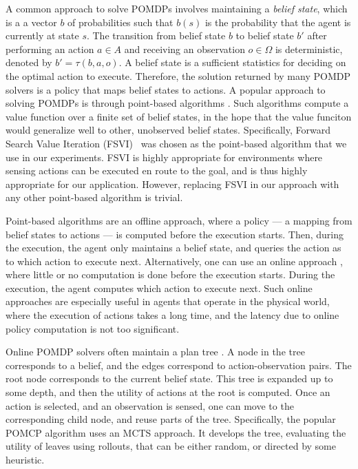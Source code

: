 \documentclass[letterpaper]{article} %
\begin{document}
A common approach to solve POMDPs involves maintaining a \emph{belief state}, which is a 
a vector $b$ of probabilities such that $b(s)$ is the probability that the agent is
currently at state $s$. 
The transition from belief state $b$ to belief state $b'$ after performing an action $a\in A$ and receiving an observation $o\in\Omega$ is deterministic, denoted by $b'=\tau(b,a,o)$. 
A belief state is a sufficient statistics for deciding on the optimal action to execute. Therefore, the solution returned by many POMDP solvers is a policy that maps belief states to actions. 
A popular approach to solving POMDPs is through point-based algorithms \cite{pineau2003point,spaan2005perseus,smith2012point}. Such algorithms compute a value function over a finite set of belief states, in the hope that the value funciton would generalize well to other, unobserved belief states.
Specifically, Forward Search Value Iteration (FSVI)~\cite{shani2007forward} was chosen as the point-based algorithm that we use in our experiments. FSVI is highly appropriate for environments where sensing actions can be executed en route to the goal, and is thus highly appropriate for our application.
However, replacing FSVI in our approach with any other point-based algorithm is trivial.

Point-based algorithms are an offline approach, where a policy --- a mapping from belief states to actions --- is computed before the execution starts. Then, during the execution, the agent only maintains a belief state, and queries the action as to which action to execute next. Alternatively, one can use an online approach \cite{washington1997bi}, where little or no computation is done before the execution starts. During the execution, the agent computes which action to execute next. Such online approaches are especially useful in agents that operate in the physical world, where the execution of actions takes a long time, and the latency due to online policy computation is not too significant.

Online POMDP solvers often maintain a plan tree \cite{silver2010monte,silver2010monte,somani2013despot}. A node in the tree corresponds to a belief, and the edges correspond to action-observation pairs. The root node corresponds to the current belief state. This tree is expanded up to some depth, and then the utility of actions at the root is computed. Once an action is selected, and an observation is sensed, one can move to the corresponding child node, and reuse parts of the tree. Specifically, the popular POMCP algorithm \cite{silver2010monte} uses an MCTS approach. It develops the tree, evaluating the utility of leaves using rollouts, that can be either random, or directed by some heuristic. 
\end{document}
